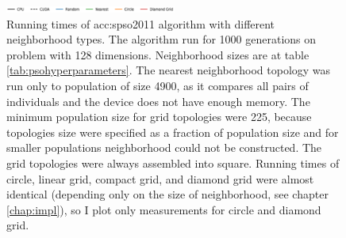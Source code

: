 \begin{figure}[ht!]
    \begin{minipage}{\textwidth}
        \centering
        \includegraphics[width=0.5\textwidth]{img/runs/time_pso_neigh_legend.pdf}
    \end{minipage}

    \caption[PSO2006 neighborhood running times]{Running times of \acrlong{acc:spso2011} algorithm with different neighborhood types. The algorithm run for 1000 generations on problem with 128 dimensions. Neighborhood sizes are at table \ref{tab:psohyperparameters}. The nearest neighborhood topology was run only to population of size 4900, as it compares all pairs of individuals and the device does not have enough memory. The minimum population size for grid topologies were 225, because topologies size were specified as a fraction of population size and for smaller populations neighborhood could not be constructed. The grid topologies were always assembled into square. Running times of circle, linear grid, compact grid, and diamond grid were almost identical (depending only on the size of neighborhood, see chapter \ref{chap:impl}), so I plot only measurements for circle and diamond grid.}
\end{figure}



